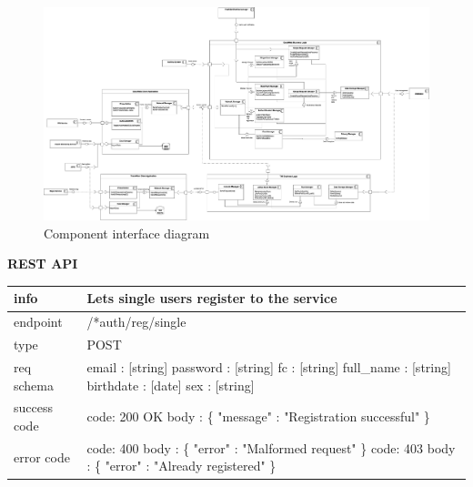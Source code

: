 \documentclass[titlepage]{article}
\begin{document}
\begin{figure}[H]
	\center
  	\includegraphics[width=15cm]{ComponentInterfaces.png}
  	\caption{Component interface diagram}
 	\label{fig:INT}
\end{figure}

\pagebreak

{\bf REST API}\\ 

\begin{tabularx}{\textwidth}{lX} \hline
    info & Lets single users register to the service \\ \hline
    endpoint & /*auth/reg/single \\ \hline
    type & POST \\ \hline
    req schema & 
        email : [string] \newline
        password : [string] \newline
        fc : [string] \newline
        full\_name : [string] \newline
        birthdate : [date] \newline
        sex : [string] \\ \hline
    success code &
        code: 200 OK \newline 
        body : \{ \newline
        "message" : "Registration successful" \newline
        \} \\ \hline
    error code &
        code: 400 \newline
        body : \{ "error" : "Malformed request" \} \newline \newline
        code: 403 \newline
        body : \{ "error" : "Already registered" \}  \\ \hline
\end{tabularx}
\end{document}
